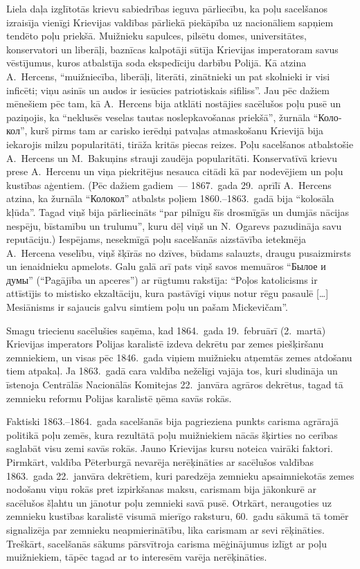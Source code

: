 \documentclass[twoside,a5paper,12pt,fleqn,openany]{extbook}
\newcommand{\rutxti}[1]{\textrussian{#1}}
\newcommand{\citespace}{[\dots{}]}
\begin{document}
Liela daļa izglītotās krievu sabiedrības ieguva pārliecību, ka poļu sacelšanos izraisīja vienīgi Krievijas valdības pārliekā piekāpība uz nacionāliem sapņiem tendēto poļu priekšā. Muižnieku sapulces, pilsētu domes, universitātes, konservatori un liberāļi, baznīcas kalpotāji sūtīja Krievijas imperatoram savus vēstījumus, kuros atbalstīja soda ekspedīciju darbību Polijā. Kā atzina A.~Hercens, ``muižniecība, liberāļi, literāti, zinātnieki un pat skolnieki ir visi inficēti; viņu asinīs un audos ir iesūcies patriotiskais sifiliss''. Jau pēc dažiem mēnešiem pēc tam, kā A.~Hercens bija atklāti nostājies sacēlušos poļu pusē un paziņojis, ka ``neklusēs veselas tautas noslepkavošanas priekšā'', žurnāla ``\rutxti{Колокол}'', kurš pirms tam ar carisko ierēdņi patvaļas atmaskošanu Krievijā bija iekarojis milzu popularitāti, tirāža kritās piecas reizes. Poļu sacelšanos atbalstošie A.~Hercens un M.~Bakuņins strauji zaudēja popularitāti. Konservatīvā krievu prese A.~Hercenu un viņa piekritējus nesauca citādi kā par nodevējiem un poļu kustības aģentiem. (Pēc dažiem gadiem~--- 1867.~gada 29.~aprīlī A.~Hercens atzina, ka žurnāla ``\rutxti{Колокол}'' atbalsts poļiem 1860.--1863.~gadā bija ``kolosāla kļūda''. Tagad viņš bija pārliecināts ``par pilnīgu šīs drosmīgās un dumjās nācijas nespēju, bīstamību un trulumu'', kuru dēļ viņš un N.~Ogarevs pazudināja savu reputāciju.) Iespējams, nesekmīgā poļu sacelšanās aizstāvība ietekmēja A.~Hercena veselību, viņš šķīrās no dzīves, būdams salauzts, draugu pusaizmirsts un ienaidnieku apmelots. Galu galā arī pats viņš savos memuāros ``\rutxti{Былое и думы}'' (``Pagājība un apceres'') ar rūgtumu rakstīja: ``Poļos katolicisms ir attīstījis to mistisko ekzaltāciju, kura pastāvīgi viņus notur rēgu pasaulē \citespace{} Mesiānisms ir sajaucis galvu simtiem poļu un pašam Mickevičam''.

Smagu triecienu sacēlušies saņēma, kad 1864.~gada 19.~februārī (2.~martā) Krievijas imperators Polijas karalistē izdeva dekrētu par zemes piešķiršanu zemniekiem, un visas pēc 1846.~gada viņiem muižnieku atņemtās zemes atdošanu tiem atpakaļ. Ja 1863.~gadā cara valdība nežēlīgi vajāja tos, kuri sludināja un īstenoja Centrālās Nacionālās Komitejas 22.~janvāra agrāros dekrētus, tagad tā zemnieku reformu Polijas karalistē ņēma savās rokās.

Faktiski 1863.--1864.~gada sacelšanās bija pagrieziena punkts carisma agrārajā politikā poļu zemēs, kura rezultātā poļu muižniekiem nācās šķirties no cerības saglabāt visu zemi savās rokās. Jauno Krievijas kursu noteica vairāki faktori. Pirmkārt, valdība Pēterburgā nevarēja nerēķināties ar sacēlušos valdības 1863.~gada 22.~janvāra dekrētiem, kuri paredzēja zemnieku apsaimniekotās zemes nodošanu viņu rokās pret izpirkšanas maksu, carismam bija jākonkurē ar sacēlušos šļahtu un jānotur poļu zemnieki savā pusē. Otrkārt, neraugoties uz zemnieku kustības karalistē visumā mierīgo raksturu, 60.~gadu sākumā tā tomēr signalizēja par zemnieku neapmierinātību, lika carismam ar sevi rēķināties. Treškārt, sacelšanās sākums pārsvītroja carisma mēģinājumus izlīgt ar poļu muižniekiem, tāpēc tagad ar to interesēm varēja nerēķināties.
\end{document}
